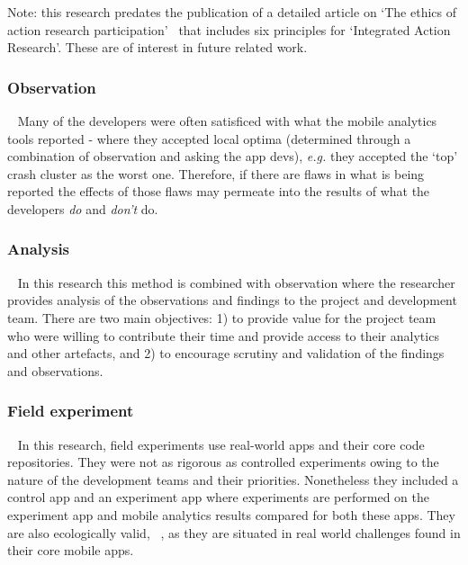 
Note: this research predates the publication of a detailed article on `The ethics of action research participation'~\citep{davison2021_the_ethics_of_action_research_participation} that includes six principles for `Integrated Action Research'. These are of interest in future related work.

\subsubsection{Observation}~\label{section-observation-research-method}
Many of the developers were often satisficed with what the mobile analytics tools reported - where they accepted local optima (determined through a combination of observation and asking the app devs), \textit{e.g.} they accepted the `top' crash cluster as the worst one. Therefore, if there are flaws in what is being reported the effects of those flaws may permeate into the results of what the developers \textit{do} and \textit{don't} do. 

\subsubsection{Analysis}~\label{section-analysis-research-method}
In this research this method is combined with observation where the researcher provides analysis of the observations and findings to the project and development team. There are two main objectives: 1) to provide value for the project team who were willing to contribute their time and provide access to their analytics and other artefacts, and 2) to encourage scrutiny and validation of the findings and observations.

\subsubsection{Field experiment}~\label{section-field-experiment-method}
In this research, field experiments use real-world apps and their core code repositories. They were not as rigorous as controlled experiments owing to the nature of the development teams and their priorities. Nonetheless they included a control app and an experiment app where experiments are performed on the experiment app and mobile analytics results compared for both these apps. They are also ecologically valid, ~\citep[p.126]{Ko2015_a_practical_guide_to_controlled_experiments_of_sw_eng_tools_with_human_participants}, as they are situated in real world challenges found in their core mobile apps.

